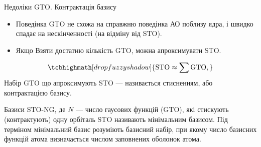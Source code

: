 \documentclass[10pt]{beamer}
\begin{document}
\begin{frame}{Недоліки GTO. Контрактація базису}
	\begin{itemize}
		\item Поведінка GTO не схожа на справжню поведінка АО поблизу ядра, і швидко спадає на нескінченності (на відміну від STO).
		\item Якщо Взяти достатню кількість GTO, можна апроксимувати STO.
	\end{itemize}

	\begin{equation*}
		\tcbhighmath[drop fuzzy shadow]{
			\mathrm{STO} \approx  \sum \mathrm{GTO} ,
		}
	\end{equation*}
	Набір GTO що апроксимують STO --- називається \alert{стисненням}, або \alert{контрактацією} базису.

	\medskip

	{\scriptsize Базиси  STO-NG, де $N$ --- число гаусових функцій (GTO), які \alert{стискують} (\alert{контрактують}) одну орбіталь STO називають \alert{мінімальним базисом}. Під терміном \alert{мінімальний базис} розуміють базисний набір, при якому \alert{число базисних функцій атома визначається числом заповнених оболонок атома}.}
\end{frame}
\end{document}
